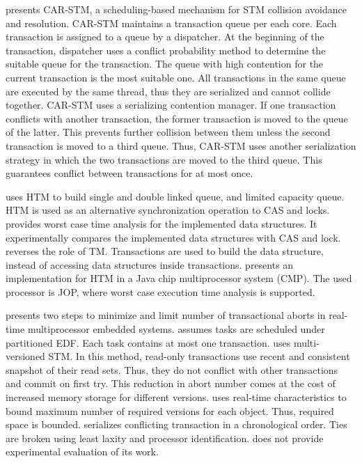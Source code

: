 \cite{Dolev:2008:CSC:1400751.1400769} presents CAR-STM, a scheduling-based
mechanism for STM collision avoidance and resolution. CAR-STM maintains
a transaction queue per each core. Each transaction is assigned to
a queue by a dispatcher. At the beginning of the transaction, dispatcher
uses a conflict probability method to determine the suitable queue
for the transaction. The queue with high contention for the current
transaction is the most suitable one. All transactions in the same
queue are executed by the same thread, thus they are serialized and
cannot collide together. CAR-STM uses a serializing contention manager.
If one transaction conflicts with another transaction, the former
transaction is moved to the queue of the latter. This prevents further
collision between them unless the second transaction is moved to a
third queue. Thus, CAR-STM uses another serialization strategy in
which the two transactions are moved to the third queue. This guarantees
conflict between transactions for at most once.

\cite{Meawad:2011:RWQ:2043910.2043912} uses HTM to build single and
double linked queue, and limited capacity queue. HTM is used as an
alternative synchronization operation to CAS and locks. \cite{Meawad:2011:RWQ:2043910.2043912}
provides worst case time analysis for the implemented data structures.
It experimentally compares the implemented data structures with CAS
and lock. \cite{Meawad:2011:RWQ:2043910.2043912} reverses the role
of TM. Transactions are used to build the data structure, instead of
accessing data structures inside transactions. \cite{5694263} presents
an implementation for HTM in a Java chip multiprocessor system (CMP).
The used processor is JOP, where worst case execution time analysis
is supported.

\cite{6068352} presents two steps to minimize and limit number of
transactional aborts in real-time multiprocessor embedded systems.
\cite{6068352} assumes tasks are scheduled under partitioned EDF.
Each task contains at most one transaction. \cite{6068352} uses multi-versioned
STM. In this method, read-only transactions use recent and consistent
snapshot of their read sets. Thus, they do not conflict with other
transactions and commit on first try. This reduction in abort number
comes at the cost of increased memory storage for different versions.
\cite{6068352} uses real-time characteristics to bound maximum number
of required versions for each object. Thus, required space is bounded.
\cite{6068352} serializes conflicting transaction in a chronological
order. Ties are broken using least laxity and processor identification.
\cite{6068352} does not provide experimental evaluation of its work. 


